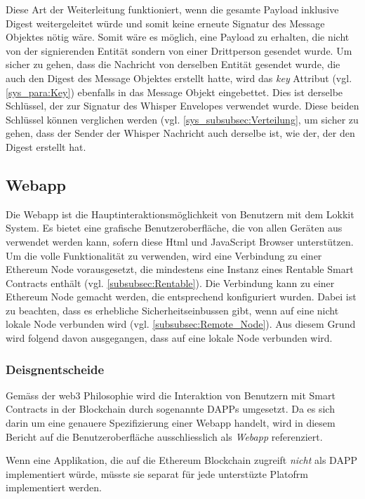 Diese Art der Weiterleitung funktioniert, wenn die gesamte Payload inklusive Digest weitergeleitet würde und somit keine erneute Signatur des Message Objektes nötig wäre. Somit wäre es möglich, eine Payload zu erhalten, die nicht von der signierenden Entität sondern von einer Drittperson gesendet wurde. Um sicher zu gehen, dass die Nachricht von derselben Entität gesendet wurde, die auch den Digest des Message Objektes erstellt hatte, wird das \emph{key} Attribut (vgl. \ref{sys_para:Key}) ebenfalls in das Message Objekt eingebettet. Dies ist derselbe Schlüssel, der zur Signatur des Whisper Envelopes verwendet wurde. Diese beiden Schlüssel können verglichen werden (vgl. \ref{sys_subsubsec:Verteilung}, um sicher zu gehen, dass der Sender der Whisper Nachricht auch derselbe ist, wie der, der den Digest erstellt hat.

\subsection{Webapp}
\label{subsec:Webapp}
Die Webapp ist die Hauptinteraktionsmöglichkeit von Benutzern mit dem Lokkit System. Es bietet eine grafische Benutzeroberfläche, die von allen Geräten aus verwendet werden kann, sofern diese Html und JavaScript Browser unterstützen. Um die volle Funktionalität zu verwenden, wird eine Verbindung zu einer Ethereum Node vorausgesetzt, die mindestens eine Instanz eines Rentable Smart Contracts enthält (vgl. \ref{subsubsec:Rentable}). Die Verbindung kann zu einer Ethereum Node gemacht werden, die entsprechend konfiguriert wurden. Dabei ist zu beachten, dass es erhebliche Sicherheitseinbussen gibt, wenn auf eine nicht lokale Node verbunden wird (vgl. \ref{subsubsec:Remote_Node}). Aus diesem Grund wird folgend davon ausgegangen, dass auf eine lokale Node verbunden wird.

\subsubsection{Deisgnentscheide}
Gemäss der web3 Philosophie wird die Interaktion von Benutzern mit Smart Contracts in der Blockchain durch sogenannte \acrshort{DAPPs} umgesetzt. Da es sich darin um eine genauere Spezifizierung einer Webapp handelt, wird in diesem Bericht auf die Benutzeroberfläche ausschliesslich als \emph{Webapp} referenziert.\cite[Wiki/DAPP-Developer-Resources, Wiki/Useful-Dapp-Patterns]{github.com/ethereum}\cite{github.com/ethereum/web3js,web3js.readthedocs.io}

Wenn eine Applikation, die auf die Ethereum Blockchain zugreift \emph{nicht} als \acrshort{DAPP} implementiert würde, müsste sie separat für jede unterstüzte Platofrm implementiert werden. 

